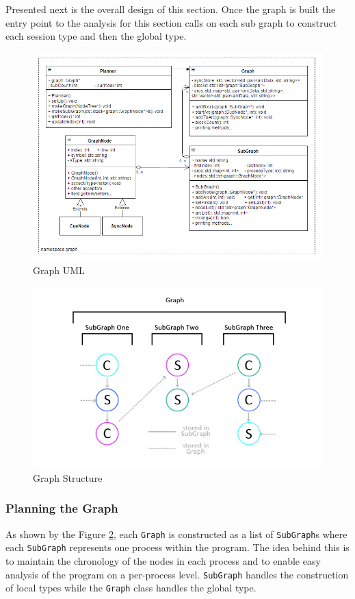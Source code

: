\documentclass[11pt, abstracton, twoside]{scrartcl}
\begin{document}
Presented next is the overall design of this section. Once the graph is
built the entry point to the analysis for this section calls on each sub 
graph to construct each session type and then the global type.

\begin{figure}[h!]
	\centering
	\includegraphics[width=\textwidth]{images/session.jpg}
	\caption{Graph UML} \label{graphUML}
\end{figure}

\begin{figure}[h!]
	\centering
	\includegraphics[width=\textwidth]{images/GSG.jpg}
	\caption{Graph Structure} \label{graphStructure}
\end{figure}

\subsubsection{Planning the Graph}
As shown by the Figure \ref{graphStructure}, each \texttt{Graph} is constructed as
a list of \texttt{SubGraph}s where each \texttt{SubGraph} represents
one process within the program. The idea behind this is to maintain
the chronology of the nodes in each process and to enable easy analysis
of the program on a per-process level. \texttt{SubGraph} handles the construction
of local types while the \texttt{Graph} class handles the global type.
\end{document}
